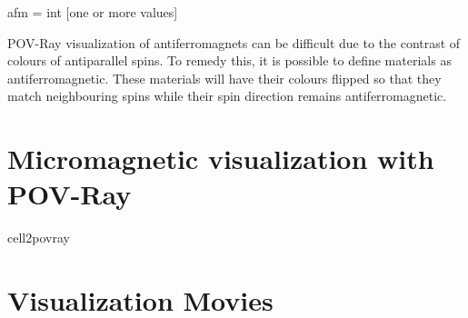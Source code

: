 {\zicf afm = int [one or more values] }
 POV-Ray visualization of
antiferromagnets can be difficult due to the contrast of colours of antiparallel
spins. To remedy this, it is possible to define materials as antiferromagnetic.
These materials will have their colours flipped so that they match neighbouring
spins while their spin direction remains antiferromagnetic.

\section*{Micromagnetic visualization with POV-Ray}
cell2povray




\section*{Visualization Movies}

